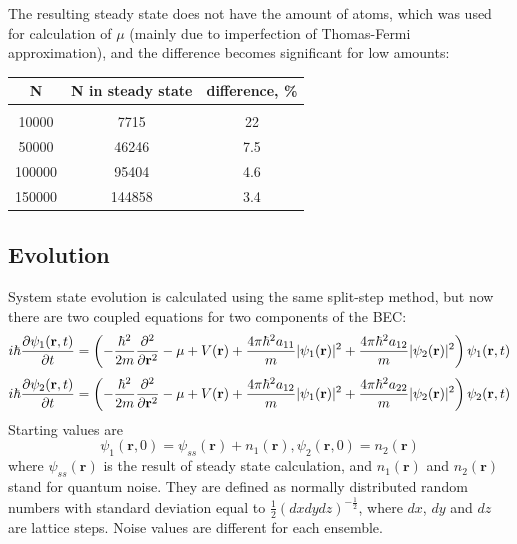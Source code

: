 \documentclass[12pt,notitlepage]{report}
\begin{document}
The resulting steady state does not have the amount of atoms, which was used for calculation of $\mu$ (mainly due to imperfection of Thomas-Fermi approximation), and the difference becomes significant for low amounts:

\begin{center}
\begin{tabular}{c|c|c}
N & N in steady state & difference, \% \\
\hline \\
10000 & 7715 & 22 \\
50000 & 46246 & 7.5 \\
100000 & 95404 & 4.6 \\
150000 & 144858 & 3.4 \\
\end{tabular}
\end{center}

\subsection*{Evolution}

System state evolution is calculated using the same split-step method, but now there are two coupled equations for two components of the BEC:
$$
i \hbar \frac{\partial \psi_1(\mathbf{r}, t)}{\partial t} = \left(-\frac{\hbar^2}{2m}\frac{\partial^2}{\partial \mathbf{r}^2} - \\
\mu + V(\mathbf{r}) + \frac{4\pi\hbar^2a_{11}}{m}\vert \psi_1(\mathbf{r}) \vert^2 + \\
\frac{4\pi\hbar^2a_{12}}{m}\vert \psi_2(\mathbf{r}) \vert^2 \right) \psi_1(\mathbf{r}, t)
$$
$$
i \hbar \frac{\partial \psi_2(\mathbf{r}, t)}{\partial t} = \left(-\frac{\hbar^2}{2m}\frac{\partial^2}{\partial \mathbf{r}^2} - \\
\mu + V(\mathbf{r}) + \frac{4\pi\hbar^2a_{12}}{m}\vert \psi_1(\mathbf{r}) \vert^2 + \\
\frac{4\pi\hbar^2a_{22}}{m}\vert \psi_2(\mathbf{r}) \vert^2 \right) \psi_2(\mathbf{r}, t)
$$
Starting values are
$$
\psi_1(\mathbf{r}, 0) = \psi_{ss}(\mathbf{r}) + n_1(\mathbf{r}), \psi_2(\mathbf{r}, 0) = n_2(\mathbf{r})
$$
where $\psi_{ss}(\mathbf{r})$ is the result of steady state calculation, and $n_1(\mathbf{r})$ and $n_2(\mathbf{r})$ stand for quantum noise. They are defined as normally distributed random numbers with standard deviation equal to $\frac{1}{2}(dx dy dz)^{-\frac{1}{2}}$, where $dx$, $dy$ and $dz$ are lattice steps. Noise values are different for each ensemble.
\end{document}
